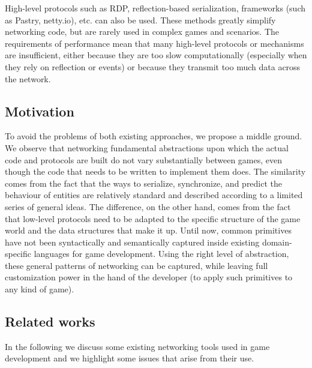 High-level protocols such as RDP, reflection-based serialization, frameworks (such as Pastry, netty.io), etc. can also be used. These methods greatly simplify networking code, but are rarely used in complex games and scenarios. The requirements of performance mean that many high-level protocols or mechanisms are insufficient, either because they are too slow computationally (especially when they rely on reflection or events) or because they transmit too much data across the network.

\subsection{Motivation}

To avoid the problems of both existing approaches, we propose a middle ground. We observe that networking fundamental abstractions upon which the actual code and protocols are built do not vary substantially between games, even though the code that needs to be written to implement them does. The similarity comes from the fact that the ways to serialize, synchronize, and predict the behaviour of entities are relatively standard and described according to a limited series of general ideas. The difference, on the other hand, comes from the fact that low-level protocols need to be adapted to the specific structure of the game world and the data structures that make it up. Until now, common primitives have not been syntactically and semantically captured inside existing domain-specific languages for game development\cite{bhatti2009domain}. Using the right level of abstraction, these general patterns of networking can be captured, while leaving full customization power in the hand of the developer (to apply such primitives to any kind of game).

\subsection{Related works}
In the following we discuss some existing networking tools used in game development and we highlight some issues that arise from their use.

